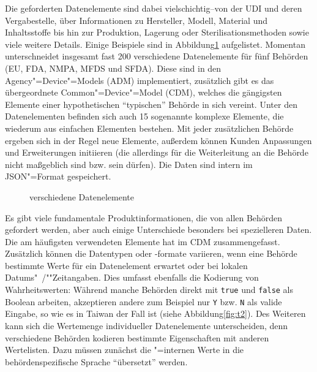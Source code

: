 Die geforderten Datenelemente sind dabei vielschichtig\nbs --\nbs von der UDI und deren Vergabestelle, über Informationen zu Hersteller, Modell, Material und Inhaltsstoffe bis hin zur Produktion, Lagerung oder Sterilisationsmethoden sowie viele weitere Details. Einige Beispiele sind in Abbildung\nbs\ref{fig:de} aufgelistet.
Momentan unterschneidet  insgesamt fast 200 verschiedene Datenelemente für fünf Behörden (EU, FDA, NMPA, MFDS und SFDA). Diese sind in den Agency"=Device"=Models (ADM) implementiert, zusätzlich gibt es das übergeordnete Common"=Device"=Model (CDM), welches die gängigsten Elemente einer hypothetischen "`typischen"' Behörde in sich vereint. Unter den Datenelementen befinden sich auch 15 sogenannte komplexe Elemente, die wiederum aus einfachen Elementen bestehen. Mit jeder zusätzlichen Behörde ergeben sich in der Regel neue Elemente, außerdem können Kunden Anpassungen und Erweiterungen initiieren (die allerdings für die Weiterleitung an die Behörde nicht maßgeblich sind bzw. sein dürfen). Die Daten sind intern im JSON"=Format gespeichert. 

\begin{figure}[htbp]
 \centering
 \caption[Beispiele für Datenelemente]{verschiedene Datenelemente}
 \label{fig:de}
\end{figure}

Es gibt viele fundamentale Produktinformationen, die von allen Behörden gefordert werden, aber auch einige Unterschiede besonders bei spezielleren Daten. Die am häufigsten verwendeten Elemente hat  im CDM zusammengefasst. \\
Zusätzlich können die Datentypen oder -formate variieren, wenn eine Behörde bestimmte Werte für ein Datenelement erwartet oder bei lokalen Datums"~/""Zeitangaben. Dies umfasst ebenfalls die Kodierung von Wahrheitswerten: Während manche Behörden direkt mit \texttt{true} und \texttt{false} als Boolean arbeiten, akzeptieren andere zum Beispiel nur \texttt{Y} bzw. \texttt{N} als valide Eingabe, so wie es in Taiwan der Fall ist (siehe Abbildung\nbs\ref{fig:t2}). Des Weiteren kann sich die Wertemenge individueller Datenelemente unterscheiden, denn verschiedene Behörden kodieren bestimmte Eigenschaften mit anderen Wertelisten. Dazu müssen zunächst die "=internen Werte in die behördenspezifische Sprache "`übersetzt"' werden.

